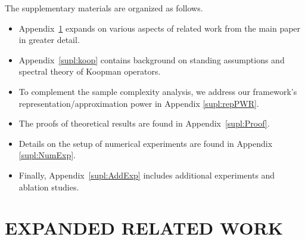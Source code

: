 \onecolumn
{}

\appendix


The supplementary materials are organized as follows.
\begin{itemize}
\item Appendix~\ref{supl:related} expands on various aspects of related work from the main paper in greater detail.
    \item  Appendix~\ref{supl:koop} contains background on standing assumptions and spectral theory of Koopman operators. 
    \item To complement the sample complexity analysis, we address our framework's representation/approximation power in Appendix \ref{supl:repPWR}.
    \item  The proofs of theoretical results are found in Appendix~\ref{supl:Proof}.
    \item Details on the setup of numerical experiments are found in Appendix \ref{supl:NumExp}.
\item Finally, Appendix~\ref{supl:AddExp} includes additional experiments and ablation studies.
\end{itemize}


\section{EXPANDED RELATED WORK}\label{supl:related}
